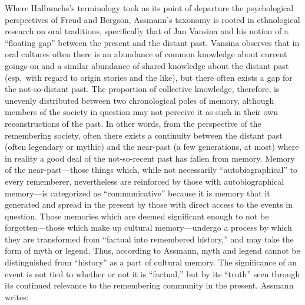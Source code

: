 Where Halbwachs's terminology took as its point of departure the
psychological perspectives of
Freud\autocite{terdiman_radstone-schwarz2011} and
Bergson\autocite{ansellpearson_radstone-schwarz2011}, Assmann's taxonomy
is rooted in ethnological research on oral traditions, specifically that
of Jan Vansina and his notion of a ``floating gap'' between the present
and the distant past.\autocite{vansina1985} Vansina observes that in
oral cultures often there is an abundance of common knowledge about
current goings-on and a similar abundance of shared knowledge about the
distant past (esp.~with regard to origin stories and the like), but
there often exists a gap for the not-so-distant past. The proportion of
collective knowledge, therefore, is unevenly distributed between two
chronological poles of memory, although members of the society in
question may not perceive it as such in their own reconstructions of the
past.\autocites[23--24]{vansina1985}[As Assmann, observes, ``In the
cultural memory of a group, both levels of the past merge seamlessly
into one another.''][35]{assmann2011} In other words, from the
perspective of the remembering society, often there exists a continuity
between the distant past (often legendary or mythic) and the near-past
(a few generations, at most) where in reality a good deal of the
not-so-recent past has fallen from memory. Memory of the
near-past---those things which, while not necessarily
``autobiographical'' to every rememberer, nevertheless are reinforced by
those with autobiographical memory---is categorized as ``communicative''
because it is memory that it generated and spread in the present by
those with direct access to the events in question. Those memories which
are deemed significant enough to not be forgotten---those which make up
cultural memory---undergo a process by which they are transformed from
``factual into remembered history,'' and may take the form of myth or
legend.\autocite[37--38]{assmann2011} Thus, according to Assmann, myth
and legend cannot be distinguished from ``history'' as a part of
cultural memory. The significance of an event is not tied to whether or
not it is ``factual,'' but by its ``truth'' seen through its continued
relevance to the remembering community in the present.\autocite[Paul
Veyne offers a particularly stimulating discussion of the perception of
the past and its relationship to myth. He concludes his book with the
insightful quote, ``The theme of this book was very simple. Merely by
reading the title, anyone with the slightest historical background would
immediately have answered, `but of course they believed in their myths!'
We have simply wanted also to make clear that what is true of `them' is
also true of ourselves and to bring out the implications of this primary
truth.''][128--129]{veyne1988} Assmann writes:

